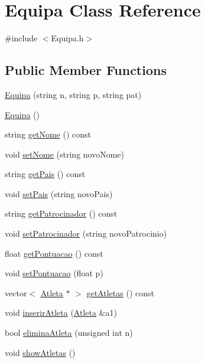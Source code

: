 \hypertarget{class_equipa}{}\section{Equipa Class Reference}
\label{class_equipa}


{\ttfamily \#include $<$Equipa.\+h$>$}

\subsection*{Public Member Functions}
\begin{DoxyCompactItemize}
\item 
\hyperlink{class_equipa_a2721072fa0d6b4451d22fdfe3c3f3c0e}{Equipa} (string n, string p, string pat)
\item 
\hyperlink{class_equipa_a71e864835165c2be093784ef38fd634d}{Equipa} ()
\item 
string \hyperlink{class_equipa_a9d20d0c8daa94e7562c5ea173337a224}{get\+Nome} () const 
\item 
void \hyperlink{class_equipa_a13e90216eb9ca9d6b2c144295a2b6730}{set\+Nome} (string novo\+Nome)
\item 
string \hyperlink{class_equipa_ac0d2108875ef6ed5833bfbd2f9921625}{get\+Pais} () const 
\item 
void \hyperlink{class_equipa_a2360f13c75fdcf75395cef84a9d0f589}{set\+Pais} (string novo\+Pais)
\item 
string \hyperlink{class_equipa_a241ab40d7dfe77af53b834482c79b94f}{get\+Patrocinador} () const 
\item 
void \hyperlink{class_equipa_aca1891ba657401bff00291ab22bb430a}{set\+Patrocinador} (string novo\+Patrocinio)
\item 
float \hyperlink{class_equipa_aeccebdc0af7faf1553e7c7eefe9e66af}{get\+Pontuacao} () const 
\item 
void \hyperlink{class_equipa_a9b63be5bd83117f9bd71bfa6e140da0d}{set\+Pontuacao} (float p)
\item 
vector$<$ \hyperlink{class_atleta}{Atleta} $\ast$ $>$ \hyperlink{class_equipa_a24c4de83cc1171ce42f442ef7be8a7c4}{get\+Atletas} () const 
\item 
void \hyperlink{class_equipa_a67f982e822a7772f2668301db0e147eb}{inserir\+Atleta} (\hyperlink{class_atleta}{Atleta} \&a1)
\item 
bool \hyperlink{class_equipa_a09a08b1ae3c9b0d782215265c667c364}{elimina\+Atleta} (unsigned int n)
\item 
void \hyperlink{class_equipa_ab17ae44fbe5b5dd2d7eea4a6d752f518}{show\+Atletas} ()

\end{DoxyCompactItemize}

